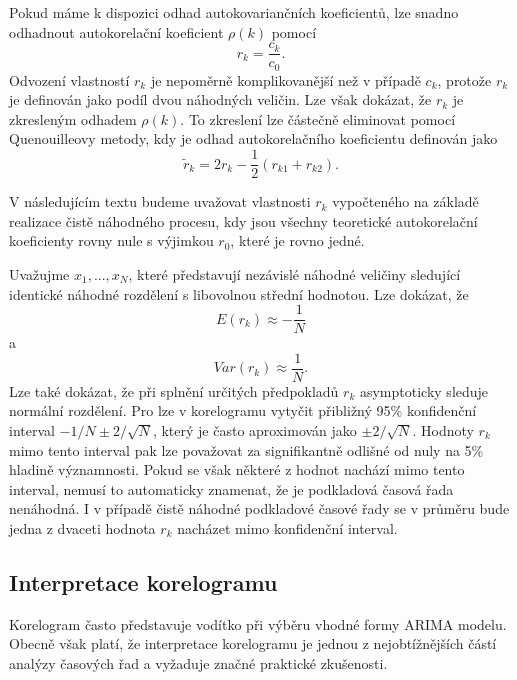 Pokud máme k dispozici odhad autokovariančních koeficientů, lze snadno odhadnout autokorelační koeficient $\rho(k)$ pomocí
\begin{equation}
r_k = \frac{c_k}{c_0}.
\end{equation}
Odvození vlastností $r_k$ je nepoměrně komplikovanější než v případě $c_k$, protože $r_k$ je definován jako podíl dvou náhodných veličin. Lze však dokázat, že $r_k$ je zkresleným odhadem $\rho(k)$. To zkreslení lze částečně eliminovat pomocí Quenouilleovy metody, kdy je odhad autokorelačního koeficientu definován jako
\begin{equation}
\tilde{r}_k = 2 r_k - \frac{1}{2}(r_{k1} + r_{k2}).
\end{equation}

V následujícím textu budeme uvažovat vlastnosti $r_k$ vypočteného na základě realizace čistě náhodného procesu, kdy jsou všechny teoretické autokorelační koeficienty rovny nule s výjimkou $r_0$, které je rovno jedné.

Uvažujme $x_1, ..., x_N$, které představují nezávislé náhodné veličiny sledující identické náhodné rozdělení s libovolnou střední hodnotou. Lze dokázat, že
\begin{equation}
E(r_k) \approx -\frac{1}{N}
\end{equation}
a
\begin{equation}
Var(r_k) \approx \frac{1}{N}.
\end{equation}
Lze také dokázat, že při splnění určitých předpokladů $r_k$ asymptoticky sleduje normální rozdělení. Pro lze v korelogramu vytyčit přibližný 95\% konfidenční interval $-1/N \pm 2/\sqrt{N}$, který je často aproximován jako $\pm 2 / \sqrt{N}$. Hodnoty $r_k$ mimo tento interval pak lze považovat za signifikantně odlišné od nuly na 5\% hladině významnosti. Pokud se však některé z hodnot nachází mimo tento interval, nemusí to automaticky znamenat, že je podkladová časová řada nenáhodná. I v případě čistě náhodné podkladové časové řady se v průměru bude jedna z dvaceti hodnota $r_k$ nacházet mimo konfidenční interval.

\subsection{Interpretace korelogramu}

Korelogram často představuje vodítko při výběru vhodné formy ARIMA modelu. Obecně však platí, že interpretace korelogramu je jednou z nejobtížnějších částí analýzy časových řad a vyžaduje značné praktické zkušenosti.

